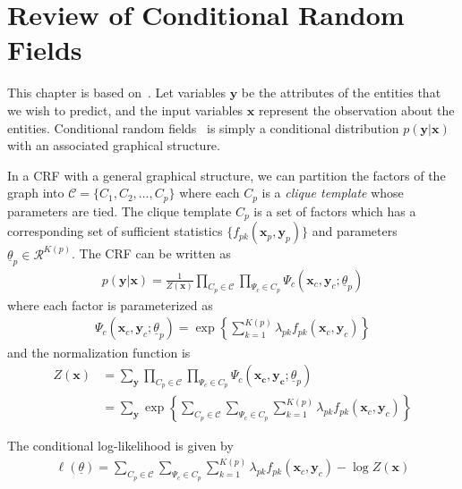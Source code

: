 \chapter{Review of Conditional Random Fields}\label{app:crf}
This chapter is based on~\cite{sutton06}. Let variables $\mathbf{y}$ be the
attributes of the entities that we wish to predict, and the input variables $\mathbf{x}$ represent the
observation about the entities. Conditional random fields~\cite{lafferty01} is
simply a conditional distribution $p(\mathbf{y}|\mathbf{x})$ with an
associated graphical structure. 

In a CRF with a general graphical structure, we can partition the factors of the
graph into $\mathcal{C}=\{C_1, C_2, \ldots, C_p\}$ where each $C_p$ is a 
\textit{clique template} whose parameters are tied.
The clique template $C_p$ is a set of factors which has a corresponding set of sufficient
statistics $\{f_{pk}(\mathbf{x}_p, \mathbf{y}_p)\}$ and parameters
$\underline{\theta}_p\in \mathcal{R}^{K(p)}$. The CRF can be written as
\begin{align*}
p(\mathbf{y}|\mathbf{x}) = \frac{1}{Z(\mathbf{x})}\prod_{C_p\in
\mathcal{C}}\prod_{\Psi_c\in C_p}\Psi_c(\mathbf{x}_c,
\mathbf{y}_c;\underline{\theta}_p)
\end{align*}
where each factor is parameterized as
\begin{align*}
\Psi_c(\mathbf{x}_c, \mathbf{y}_c;
\underline{\theta}_p) =
\exp\left\{\sum_{k=1}^{K(p)}\lambda_{pk}f_{pk}(\mathbf{x}_c,
\mathbf{y}_c)\right\}
\end{align*}
and the normalization function is
\begin{align*}
Z(\mathbf{x})
&= \sum_{\mathbf{y}}\prod_{C_p\in\mathcal{C}}\prod_{\Psi_c\in
C_p}\Psi_c(\mathbf{x_c}, \mathbf{y_c}; \underline{\theta}_p)\\
&= \sum_{\mathbf{y}}\exp\left\{\sum_{C_p\in\mathcal{C}}\sum_{\Psi_c\in
C_p}\sum_{k=1}^{K(p)}\lambda_{pk}f_{pk}(\mathbf{x}_c,
\mathbf{y}_c)\right\}
\end{align*}

The conditional log-likelihood is given by
\begin{align*}
\ell(\underline{\theta}) = \sum_{C_p\in\mathcal{C}}\sum_{\Psi_c\in
C_p}\sum_{k=1}^{K(p)}\lambda_{pk}f_{pk}(\mathbf{x}_c, \mathbf{y}_c) - \log Z(\mathbf{x})
\end{align*}

